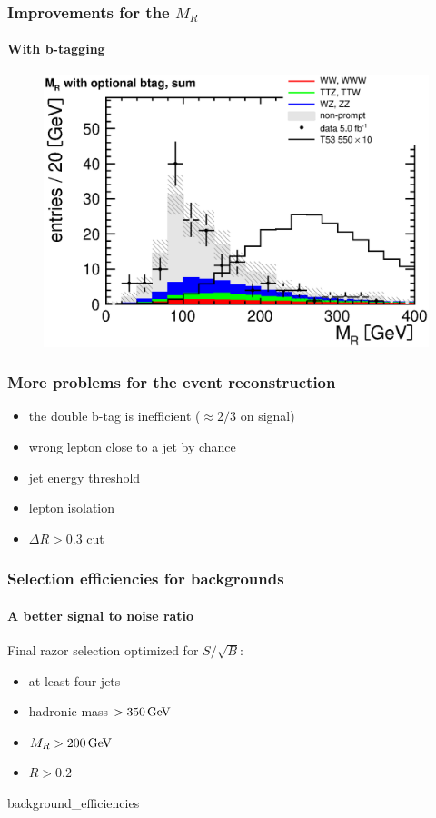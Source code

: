 \documentclass[ukenglish]{beamer}
\begin{document}
\begin{frame}
    \frametitle{Improvements for the $M_R$}
    \framesubtitle{With b-tagging}
        \begin{figure}[h!]
            \centering
                    \includegraphics[height=.8\textheight]{mr_optional_btag_sum.eps}
        \end{figure}
\end{frame}

\begin{frame}
    \frametitle{More problems for the event reconstruction}
    \begin{itemize}
        \item the double b-tag is inefficient ($\approx 2/3$ on signal)
        \item wrong lepton close to a jet by chance
        \item jet energy threshold
        \item lepton isolation
        \item $\Delta R > 0.3$ cut
    \end{itemize}
\end{frame}

\begin{frame}
    \frametitle{Selection efficiencies for backgrounds}
    \framesubtitle{A better signal to noise ratio}
    Final razor selection optimized for $S/\sqrt{B}$:
    \begin{itemize}
        \item at least four jets
        \item hadronic mass $>\unit[350]{GeV}$
        \item $M_R > \unit[200]{GeV}$
        \item $R > 0.2$
    \end{itemize}
    {background_efficiencies}
\end{frame}
\end{document}
